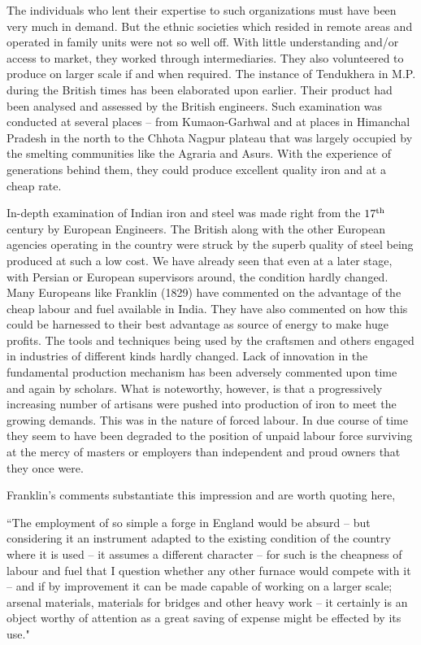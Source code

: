 The individuals who lent their expertise to such organizations must have been very much in demand. But the ethnic societies which resided in remote areas and operated in family units were not so well off. With little understanding and/or access to market, they worked through intermediaries. They also volunteered to produce on larger scale if and when required. The instance of Tendukhera in M.P. during the British times has been elaborated upon earlier. Their product had been analysed and assessed by the British engineers. Such examination was conducted at several places – from Kumaon-Garhwal and at places in Himanchal Pradesh in the north to the Chhota Nagpur plateau that was largely occupied by the smelting communities like the Agraria and Asurs. With the experience of generations behind them, they could produce excellent quality iron and at a cheap rate. 

In-depth examination of Indian iron and steel was made right from the $17^{\rm th}$ century by European Engineers. The British along with the other European agencies operating in the country were struck by the superb quality of steel being produced at such a low cost. We have already seen that even at a later stage, with Persian or European supervisors around, the condition hardly changed. Many Europeans like Franklin (1829) have commented on the advantage of the cheap labour and fuel available in India. They have also commented on how this could be harnessed to their best advantage as source of energy to make huge profits. The tools and techniques being used by the craftsmen and others engaged in industries of different kinds hardly changed. Lack of innovation in the fundamental production mechanism has been adversely commented upon time and again by scholars. What is noteworthy, however, is that a progressively increasing number of artisans were pushed into production of iron to meet the growing demands. This was in the nature of forced labour. In due course of time they seem to have been degraded to the position of unpaid labour force surviving at the mercy of masters or employers than independent and proud owners that they once were.

Franklin's comments substantiate this impression and are worth quoting here,

 \footnotesize{``The employment of so simple a forge in England would be absurd – but considering it an instrument adapted to the existing condition of the country where it is used – it assumes a different character – for such is the cheapness of labour and fuel that I question whether any other furnace would compete with it – and if by improvement it can be made capable of working on a larger scale; arsenal materials, materials for bridges and other heavy work – it certainly is an object worthy of attention as a great saving of expense might be effected by its use."} 


